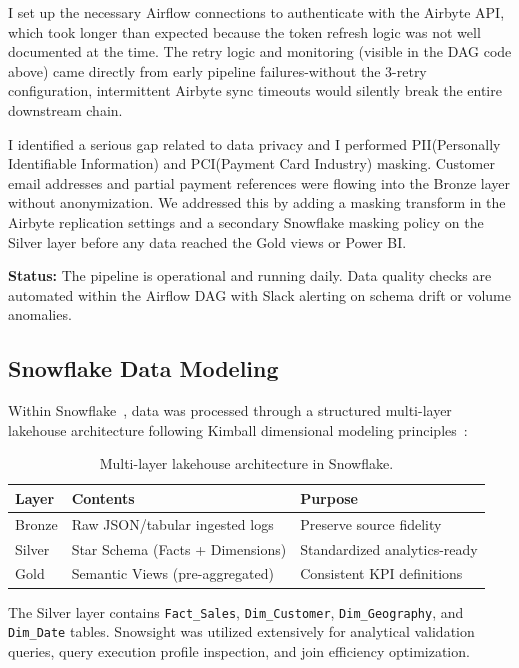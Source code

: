 \documentclass[11pt,a4paper]{article}
\begin{document}
I set up the necessary Airflow connections to authenticate with the Airbyte API, which took longer than expected because the token refresh logic was not well documented at the time. The retry logic and monitoring (visible in the DAG code above) came directly from early pipeline failures-without the 3-retry configuration, intermittent Airbyte sync timeouts would silently break the entire downstream chain.

I identified a serious gap related to data privacy and I performed PII(Personally Identifiable Information) and PCI(Payment Card Industry) masking. Customer email addresses and partial payment references were flowing into the Bronze layer without anonymization. We addressed this by adding a masking transform in the Airbyte replication settings and a secondary Snowflake masking policy on the Silver layer before any data reached the Gold views or Power BI.

\textbf{Status:} The pipeline is operational and running daily. Data quality checks are automated within the Airflow DAG with Slack alerting on schema drift or volume anomalies.

\subsection{Snowflake Data Modeling}

Within Snowflake~\cite{snowflake2024snowpark}, data was processed through a structured multi-layer lakehouse architecture following Kimball dimensional modeling principles~\cite{kimball2013dw}:

\begin{table}[H]
\caption{Multi-layer lakehouse architecture in Snowflake.}
\setlength{\tabcolsep}{12pt}
\renewcommand{\arraystretch}{1.4}
\begin{tabular}{l l l}
\toprule
\textbf{Layer} & \textbf{Contents} & \textbf{Purpose} \\
\midrule
Bronze & Raw JSON/tabular ingested logs & Preserve source fidelity \\
Silver & Star Schema (Facts + Dimensions) & Standardized analytics-ready \\
Gold & Semantic Views (pre-aggregated) & Consistent KPI definitions \\
\bottomrule
\end{tabular}
\end{table}

The Silver layer contains \texttt{Fact\_Sales}, \texttt{Dim\_Customer}, \texttt{Dim\_Geography}, and \texttt{Dim\_Date} tables. Snowsight was utilized extensively for analytical validation queries, query execution profile inspection, and join efficiency optimization.
\end{document}
